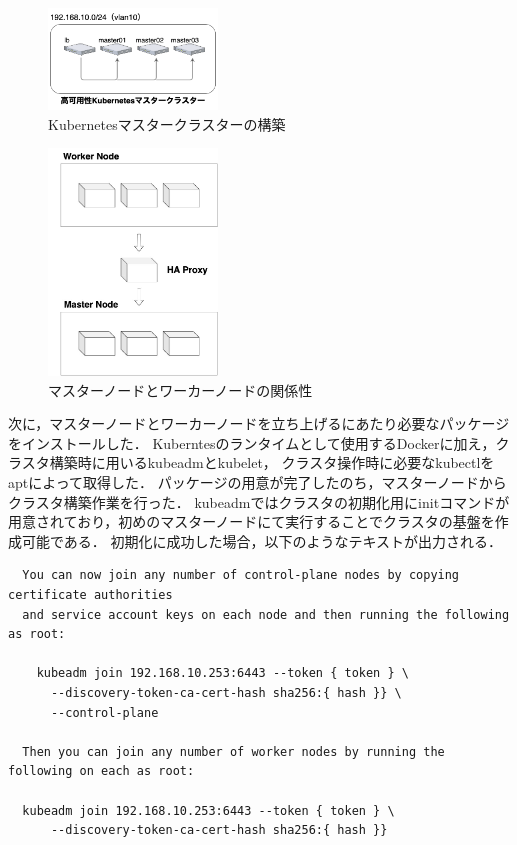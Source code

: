 \begin{figure}[htbp]
  \begin{center}
    \includegraphics[width=0.4\textwidth]{./figures/implement-environment-master-cluster-Page-2.png}
    \caption{Kubernetesマスタークラスターの構築}
  \end{center}
\end{figure}

\begin{figure}[htbp]
  \begin{center}
    \includegraphics[width=0.4\textwidth]{./figures/haproxy.jpg}
    \caption{マスターノードとワーカーノードの関係性}
  \end{center}
\end{figure}

次に，マスターノードとワーカーノードを立ち上げるにあたり必要なパッケージをインストールした．
Kuberntesのランタイムとして使用するDockerに加え，クラスタ構築時に用いるkubeadmとkubelet， クラスタ操作時に必要なkubectlをaptによって取得した．
パッケージの用意が完了したのち，マスターノードからクラスタ構築作業を行った．
kubeadmではクラスタの初期化用にinitコマンドが用意されており，初めのマスターノードにて実行することでクラスタの基盤を作成可能である．
初期化に成功した場合，以下のようなテキストが出力される．\\

\begin{lstlisting}
  You can now join any number of control-plane nodes by copying certificate authorities
  and service account keys on each node and then running the following as root:

    kubeadm join 192.168.10.253:6443 --token { token } \
      --discovery-token-ca-cert-hash sha256:{ hash }} \
      --control-plane

  Then you can join any number of worker nodes by running the following on each as root:

  kubeadm join 192.168.10.253:6443 --token { token } \
      --discovery-token-ca-cert-hash sha256:{ hash }}
\end{lstlisting}


